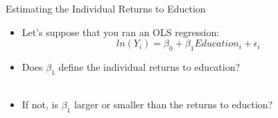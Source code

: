 \documentclass{beamer}
\begin{document}
\begin{frame}[<+->]{Estimating the Individual Returns to Eduction}
\begin{itemize}
\item Let's suppose that you ran an OLS regression:
	\begin{equation}
	ln(Y_i) = \beta_0 + \beta_1 Education_i + \epsilon_i
	\end{equation}
\item Does $\beta_1$ define the individual returns to education? \\~\\
\item If not, is $\beta_1$ larger or smaller than the returns to eduction?
\end{itemize}
\end{frame}
\end{document}
